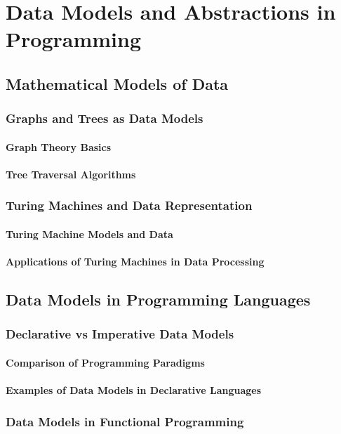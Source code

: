 \documentclass[12pt, oneside]{book}
\begin{document}
\chapter{Data Models and Abstractions in Programming}
\section{Mathematical Models of Data}
\subsection{Graphs and Trees as Data Models}
\subsubsection{Graph Theory Basics}
\subsubsection{Tree Traversal Algorithms}
\subsection{Turing Machines and Data Representation}
\subsubsection{Turing Machine Models and Data}
\subsubsection{Applications of Turing Machines in Data Processing}
\section{Data Models in Programming Languages}
\subsection{Declarative vs Imperative Data Models}
\subsubsection{Comparison of Programming Paradigms}
\subsubsection{Examples of Data Models in Declarative Languages}
\subsection{Data Models in Functional Programming}
\end{document}
